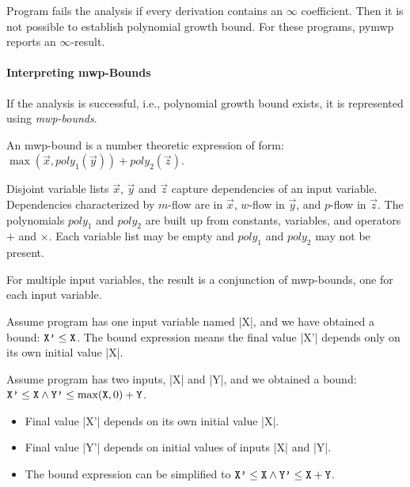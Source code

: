Program fails the analysis if every derivation contains an \(\infty\) coefficient.
Then it is not possible to establish polynomial growth bound.
For these programs, pymwp reports an \(\infty\)-result.

\paragraph*{Interpreting mwp-Bounds}

If the analysis is successful, i.e., polynomial growth bound exists, it is represented using \emph{mwp-bounds}.

An mwp-bound is a number theoretic expression of form: \(\max(\vec x, poly_1(\vec y)) + poly_2(\vec z)\).

Disjoint variable lists \(\vec x\), \(\vec y\) and \(\vec z\) capture dependencies of an input variable.
Dependencies characterized by \(m\)-flow are in \(\vec x\), \(w\)-flow in \(\vec y\), and \(p\)-flow in \(\vec z\).
The polynomials \(poly_1\) and \(poly_2\) are built up from constants, variables, and operators \(+\) and \(\times\).
Each variable list may be empty and \(poly_1\) and \(poly_2\) may not be present.

For multiple input variables, the result is a conjunction of mwp-bounds, one for each input variable.

\begin{example}
    Assume program has one input variable named \pr|X|, and we have obtained a bound: \(\prm{X'} \leq \prm{X}\).
    The bound expression means the final value \pr|X'| depends only on its own initial value \pr|X|.
\end{example}

\begin{example}
    Assume program has two inputs, \pr|X| and \pr|Y|, and we obtained a bound:
    \(\prm{X'} \leq \prm{X} \land \prm{Y'} \leq \max(\prm{X}, 0) + \prm{Y}\).
\end{example}

\begin{itemize}
    \item Final value \pr|X'| depends on its own initial value \pr|X|.
    \item Final value \pr|Y'| depends on initial values of inputs \pr|X| and \pr|Y|.
    \item The bound expression can be simplified to
          \(\prm{X'} \leq \prm{X} \land \prm{Y'} \leq \prm{X} + \prm{Y}\).
\end{itemize}

